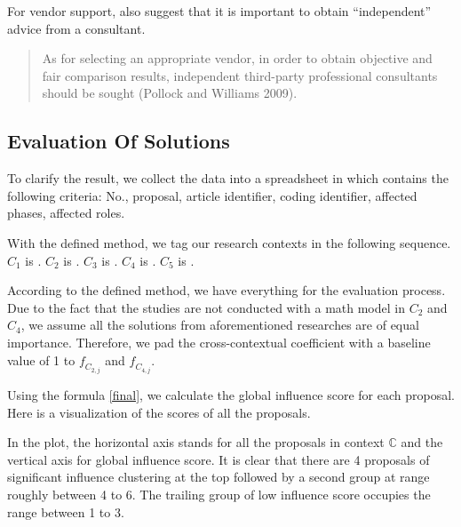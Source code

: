 For vendor support, \citeauthor{6} also suggest that it is important to obtain “independent” advice from a consultant.

\begin{quotation}
As for selecting an appropriate vendor, in order to obtain objective and fair comparison results, independent third-party professional consultants should be sought (Pollock and Williams 2009).
\end{quotation}

\subsection{Evaluation Of Solutions}
\label{section:evaluation}
To clarify the result, we collect the data into a spreadsheet in which contains the following criteria: No., proposal, article identifier, coding identifier, affected phases, affected roles.

With the defined method, we tag our research contexts in the following sequence.
$C_{1}$ is .
$C_{2}$ is .
$C_{3}$ is .
$C_{4}$ is .
$C_{5}$ is .

According to the defined method, we have everything for the evaluation process. Due to the fact that the studies are not conducted with a math model in $C_{2}$ and $C_{4}$, we assume all the solutions from aforementioned researches are of equal importance. Therefore, we pad the cross-contextual coefficient with a baseline value of 1 to $\mathit{f_{C_{2,j}}}$ and $\mathit{f_{C_{4,j}}}$.

Using the formula \ref{final}, we calculate the global influence score for each proposal. Here is a visualization of the scores of all the proposals.

\begin{figure}[ht]
\centering
{}
\end{figure}

In the plot, the horizontal axis stands for all the proposals in context $\mathbb{C}$ and the vertical axis for global influence score. It is clear that there are 4 proposals of significant influence clustering at the top followed by a second group at range roughly between 4 to 6. The trailing group of low influence score occupies the range between 1 to 3.

